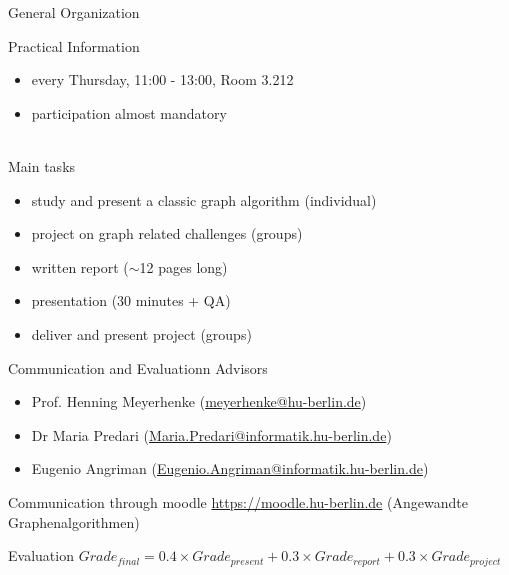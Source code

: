 \documentclass[titlepage,german,presentation]{beamer}
\begin{document}
\begin{frame}{General Organization}

  Practical Information
  \begin{itemize}
  \item every Thursday, 11:00 - 13:00, Room 3.212
  \item participation almost mandatory
  \end{itemize}
  ~\\
  Main tasks
  \begin{itemize}
  \item study and present a classic graph algorithm (individual)
  \item project on graph related challenges (groups)
  \item written report ($\sim$12 pages long)
  \item presentation (30 minutes + QA)
  \item deliver and present project (groups)  
\end{itemize}
\end{frame}

\begin{frame}{Communication and Evaluationn}
  Advisors
  \begin{itemize}
  \item Prof. Henning Meyerhenke (\url{meyerhenke@hu-berlin.de})
  \item Dr Maria Predari (\url{Maria.Predari@informatik.hu-berlin.de})
  \item Eugenio Angriman (\url{Eugenio.Angriman@informatik.hu-berlin.de})
\end{itemize}
  Communication through moodle \url{https://moodle.hu-berlin.de} (Angewandte Graphenalgorithmen)

  \begin{block}{Evaluation}
  $Grade_{final} = 0.4 \times Grade_{present} + 0.3 \times Grade_{report} + 0.3 \times Grade_{project}$
  \end{block}
\end{frame}
\end{document}
